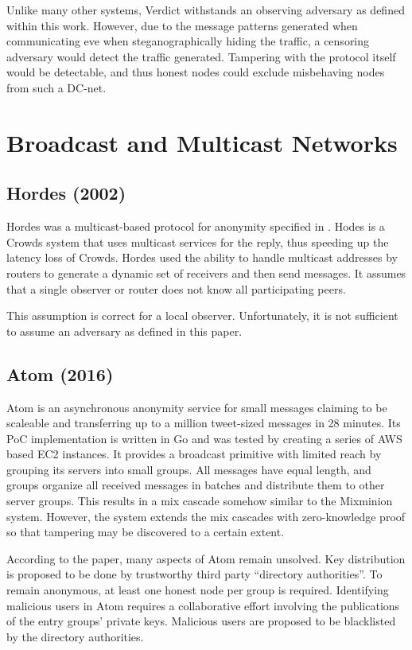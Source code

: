Unlike many other systems, Verdict withstands an observing adversary as defined within this work. However, due to the message patterns generated when communicating eve when steganographically hiding the traffic, a censoring adversary would detect the traffic generated. Tampering with the protocol itself would be detectable, and thus honest nodes could exclude misbehaving nodes from such a DC-net.

\section{Broadcast and Multicast Networks}
\subsection{Hordes (2002)}
Hordes was a multicast-based protocol for anonymity specified in \cite{Levine:2002}. Hodes is a Crowds system that uses multicast services for the reply, thus speeding up the latency loss of Crowds. Hordes used the ability to handle multicast addresses by routers to generate a dynamic set of receivers and then send messages. It assumes that a single observer or router does not know all participating peers. 

This assumption is correct for a local observer. Unfortunately, it is not sufficient to assume an adversary as defined in this paper.

\subsection{Atom (2016)}
Atom\cite{kwon2016atom} is an asynchronous anonymity service for small messages claiming to be scaleable and transferring up to a million tweet-sized messages in 28 minutes. Its PoC implementation is written in Go and was tested by creating a series of AWS based EC2 instances. It provides a broadcast primitive with limited reach by grouping its servers into small groups. All messages have equal length, and groups organize all received messages in batches and distribute them to other server groups. This results in a mix cascade somehow similar to the Mixminion system. However, the system extends the mix cascades with zero-knowledge proof so that tampering may be discovered to a certain extent.

According to the paper, many aspects of Atom remain unsolved. Key distribution is proposed to be done by trustworthy third party ``directory authorities''. To remain anonymous, at least one honest node per group is required. Identifying malicious users in Atom requires a collaborative effort involving the publications of the entry groups' private keys. Malicious users are proposed to be blacklisted by the directory authorities. 

